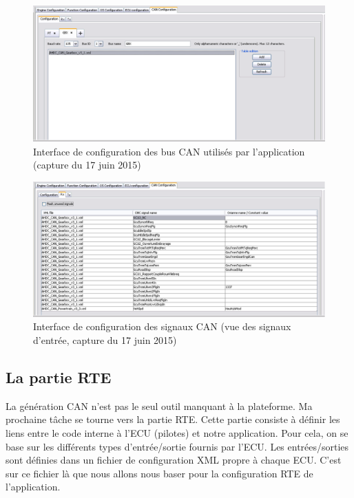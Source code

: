 \begin{figure}[h]
 \centering
 \centerline{\includegraphics[scale=0.47]{images/ihmcan_conf}}
 \caption{Interface de configuration des bus CAN utilisés par l'application (capture du 17 juin 2015)}
 \label{fig:ihmcan_conf}
\end{figure}

\begin{figure}[h]
  \centering
  \centerline{\includegraphics[scale=0.47]{images/ihmcan_signal}}
  \caption{Interface de configuration des signaux CAN (vue des signaux d'entrée, capture du 17 juin 2015)}
  \label{fig:ihmcan_signal}
\end{figure}


\subsection{La partie RTE}
La génération CAN n'est pas le seul outil manquant à la plateforme. Ma
prochaine tâche se tourne vers la partie RTE. Cette partie consiste à définir
les liens entre le code interne à l'ECU (pilotes) et notre application. Pour
cela, on se base sur les différents types d'entrée/sortie fournis par l'ECU. Les
entrées/sorties sont définies dans un fichier de configuration XML propre à
chaque ECU. C'est sur ce fichier là que nous allons nous baser pour la
configuration RTE de l'application.

